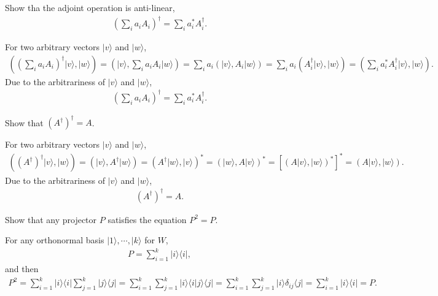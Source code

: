 \documentclass[en]{sol-man}
\begin{document}
\begin{exe}
    Show tha the adjoint operation is anti-linear,
    \begin{align}
        \left(\sum_ia_iA_i\right)^{\dagger}=\sum_ia_i^*A_i^{\dagger}.
    \end{align}
\end{exe}
\begin{pf}
    For two arbitrary vectors $\lvert v\rangle$ and $\lvert w\rangle$,
    \begin{align}
        \left(\left(\sum_ia_iA_i\right)^{\dagger}\lvert v\rangle,\lvert w\rangle\right)=\left(\lvert v\rangle,\sum_ia_iA_i\lvert w\rangle\right)=\sum_ia_i(\lvert v\rangle,A_i\lvert w\rangle)=\sum_ia_i(A_i^{\dagger}\lvert v\rangle,\lvert w\rangle)=\left(\sum_ia_i^*A_i^{\dagger}\lvert v\rangle,\lvert w\rangle\right).
    \end{align}
    Due to the arbitrariness of $\lvert v\rangle$ and $\lvert w\rangle$,
    \begin{align}
        \left(\sum_ia_iA_i\right)^{\dagger}=\sum_ia_i^*A_i^{\dagger}.
    \end{align}
\end{pf}

\begin{exe}
    Show that $(A^{\dagger})^{\dagger}=A$.
\end{exe}
\begin{pf}
    For two arbitrary vectors $\lvert v\rangle$ and $\lvert w\rangle$,
    \begin{align}
        ((A^{\dagger})^{\dagger}\lvert v\rangle,\lvert w\rangle)=(\lvert v\rangle,A^{\dagger}\lvert w\rangle)=(A^{\dagger}\lvert w\rangle,\lvert v\rangle)^*=(\lvert w\rangle,A\lvert v\rangle)^*=[(A\lvert v\rangle,\lvert w\rangle)^*]^*=(A\lvert v\rangle,\lvert w\rangle).
    \end{align}
    Due to the arbitrariness of $\lvert v\rangle$ and $\lvert w\rangle$,
    \begin{align}
        (A^{\dagger})^{\dagger}=A.
    \end{align}
\end{pf}

\begin{exe}
    Show that any projector $P$ satisfies the equation $P^2=P$.
\end{exe}
\begin{pf}
    For any orthonormal basis $\lvert 1\rangle,\cdots,\lvert k\rangle$ for $W$,
    \begin{align}
        P=\sum_{i=1}^k\lvert i\rangle\langle i\rvert,
    \end{align}
    and then
    \begin{align}
        P^2=\sum_{i=1}^k\lvert i\rangle\langle i\rvert\sum_{j=1}^k\lvert j\rangle\langle j\rvert=\sum_{i=1}^k\sum_{j=1}^k\lvert i\rangle\langle i\vert j\rangle\langle j\rvert=\sum_{i=1}^k\sum_{j=1}^k\lvert i\rangle\delta_{ij}\langle j\rvert=\sum_{i=1}^k\lvert i\rangle\langle i\rvert=P.
    \end{align}
\end{pf}
\end{document}
